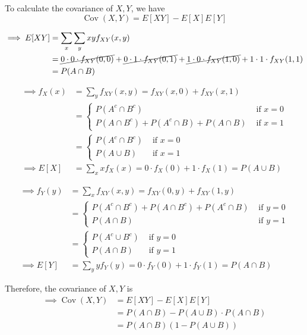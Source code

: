 To calculate the covariance of \( X, Y \), we have
\begin{equation*}
    \operatorname{Cov}(X, Y) = E[XY] - E[X]E[Y]
\end{equation*}

\begin{align*}
    \implies
    E[XY]
     & =
    \sum_{x} \sum_{y} xy f_{XY}(x, y)
    \\ & =
    \cancel{0 \cdot 0 \cdot f_{XY}(0, 0)}
    + \cancel{0 \cdot 1 \cdot f_{XY}(0, 1)}
    + \cancel{1 \cdot 0 \cdot f_{XY}(1, 0)}
    + 1 \cdot 1 \cdot f_{XY}(1, 1)
    \\ & =
    P(A \cap B)
\end{align*}

\begin{align*}
    \implies
    f_X (x)
     & =
    \sum_{y} f_{XY}(x, y)
    =
    f_{XY}(x, 0)
    + f_{XY}(x, 1)
    \\ & =
    \begin{cases}
        P(A^{c} \cap B^{c})
         &
        \text { if } x=0
        \\
        P(A \cap B^{c})
        + P(A^{c} \cap B)
        + P(A \cap B)
         &
        \text { if } x=1
    \end{cases}
    \\ & =
    \begin{cases}
        P(A^{c} \cap B^{c})
         &
        \text { if } x=0
        \\
        P(A \cup B)
         &
        \text { if } x=1
    \end{cases}
    \\
    \implies
    E[X]
     & =
    \sum_{x} x f_X(x)
    =
    0 \cdot f_X(0)
    + 1 \cdot f_X(1)
    =
    P(A \cup B)
\end{align*}

\begin{align*}
    \implies
    f_Y (y)
     & =
    \sum_{x} f_{XY}(x, y)
    =
    f_{XY}(0, y)
    + f_{XY}(1, y)
    \\ & =
    \begin{cases}
        P(A^{c} \cap B^{c})
        + P(A \cap B^{c})
        + P(A^{c} \cap B)
         &
        \text { if } y=0
        \\
        P(A \cap B)
         &
        \text { if } y=1
    \end{cases}
    \\ & =
    \begin{cases}
        P(A^{c} \cup B^{c})
         &
        \text { if } y=0
        \\
        P(A \cap B)
         &
        \text { if } y=1
    \end{cases}
    \\
    \implies
    E[Y]
     & =
    \sum_{y} y f_Y(y)
    =
    0 \cdot f_Y(0) + 1 \cdot f_Y(1)
    =
    P(A \cap B)
\end{align*}

Therefore, the covariance of \( X, Y \) is
\begin{align*}
    \implies
    \operatorname{Cov}(X, Y)
     & =
    E[XY] - E[X]E[Y]
    \\ & =
    P(A \cap B) - P(A \cup B) \cdot P(A \cap B)
    \\ & =
    \boxed{
        P(A \cap B) (1 - P(A \cup B))
    }
\end{align*}
